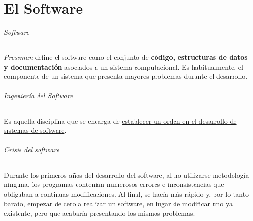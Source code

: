 \part{El Software}

\paragraph{Software}
\textit{Pressman} define el software como el conjunto de \textbf{código, estructuras de datos y documentación} asociados a un sistema computacional. Es habitualmente, el componente de un sistema que presenta mayores problemas durante el desarrollo.

\paragraph{Ingeniería del Software}
Es aquella disciplina que se encarga de \uline{establecer un orden en el desarrollo de sistemas de software}.

\paragraph{Crisis del software}
Durante los primeros años del desarrollo del software, al no utilizarse metodología ninguna, los programas contenian numerosos errores e inconsistencias que obligaban a continuas modificaciones. Al final, se hacía más rápido y, por lo tanto barato, empezar de cero a realizar un software, en lugar de modificar uno ya existente, pero que acabaría presentando los mismos problemas.

